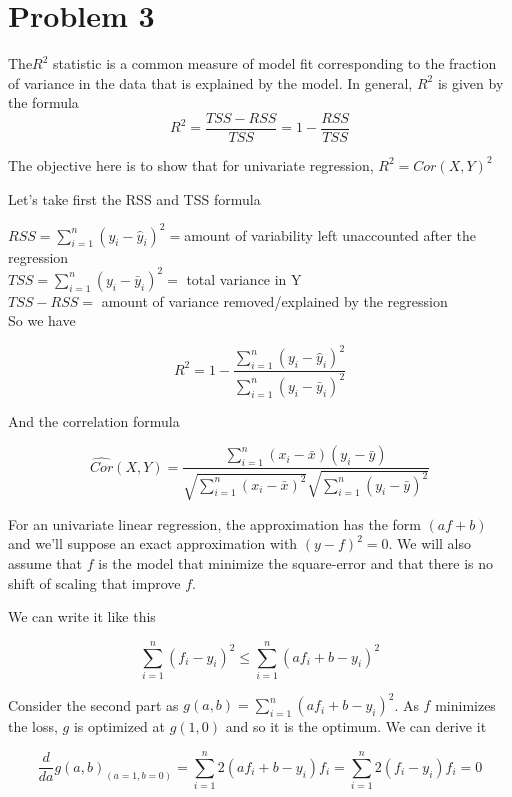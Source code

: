 \section*{Problem 3}

The$R^2$ statistic is a common measure of model fit corresponding to the fraction of variance in the data that is explained by the model. In general, $R^2$ is given by the formula
\[ R^2 = \frac{TSS - RSS}{TSS} = 1 - \frac{RSS}{TSS} \]

The objective here is to show that for univariate regression, $R^2 = Cor(X,Y)^2$

Let's take first the RSS and TSS formula

$ RSS = \sum\limits_{i=1}^n (y_i - \hat{y}_i)^2 = $amount of variability left unaccounted after the regression\\


$TSS = \sum\limits_{i=1}^n (y_i - \bar{y}_i)^2 =$ total variance in Y\\



$ TSS - RSS = $ amount of variance removed/explained by the regression\\


So we have 

\[ R^2 = 1 - \frac{\sum\limits_{i=1}^n (y_i - \hat{y}_i)^2}{\sum\limits_{i=1}^n (y_i - \bar{y}_i)^2 } \]

And the correlation formula

\[ \widehat{Cor}(X,Y) = \frac{\sum\limits_{i=1}^n(x_i - \bar{x})(y_i - \bar{y})}{\sqrt{\sum\limits_{i=1}^n(x_i - \bar{x})^2}\sqrt{\sum\limits_{i=1}^n(y_i - \bar{y})^2}} \]

For an univariate linear regression, the approximation has the form $(af + b) $ and we'll suppose an exact approximation with $(y - f)^2 = 0 $. We will also assume that $f$ is the model that minimize the square-error and that there is no shift of scaling that improve $f$. 

We can write it like this

\[ \sum\limits_{i=1}^n(f_i - y_i)^2 \leq \sum\limits_{i=1}^n(af_i + b - y_i)^2 \]

Consider the second part as $g(a,b) = \sum\limits_{i=1}^n(af_i + b - y_i)^2  $. As $f$ minimizes the loss, $g$ is optimized at $g(1,0)$ and so it is the optimum. We can derive it

\[ \frac{d}{da}g(a,b)_{(a = 1, b = 0)} = \sum\limits_{i=1}^n 2(af_i + b - y_i)f_i = \sum\limits_{i=1}^n 2(f_i - y_i)f_i = 0  \]

